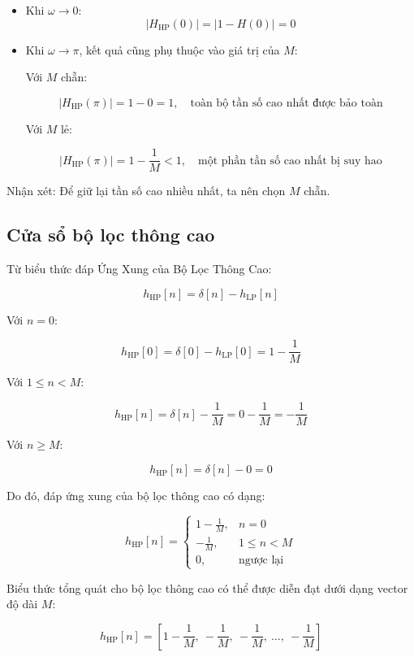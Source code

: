 \begin{itemize}
	\item Khi \( \omega \to 0 \):
	\[
	|H_{\mathrm{HP}}(0)| = |1 - H(0)| = 0
	\]
	
	\item Khi \( \omega \to \pi \), kết quả cũng phụ thuộc vào giá trị của \( M \):
	
	Với \( M \) chẵn:
	
	\[
	|H_{\mathrm{HP}}(\pi)| = 1 - 0 = 1, \quad \text{toàn bộ tần số cao nhất được bảo toàn}
	\]
	
	Với \( M \) lẻ:
	
	\[
	|H_{\mathrm{HP}}(\pi)| = 1 - \frac{1}{M} < 1, \quad \text{một phần tần số cao nhất bị suy hao}
	\]
\end{itemize}



Nhận xét: Để giữ lại tần số cao nhiều nhất, ta nên chọn \( M \) chẵn.

\subsection*{Cửa sổ bộ lọc thông cao}
\label{sec:cua_so_loc_thong_cao}

Từ biểu thức đáp Ứng Xung của Bộ Lọc Thông Cao:

\[
h_{\mathrm{HP}}[n] = \delta[n] - h_{\mathrm{LP}}[n]
\]

Với \( n = 0 \):

\[
h_{\mathrm{HP}}[0] = \delta[0] - h_{\mathrm{LP}}[0] = 1 - \frac{1}{M}
\]

Với \( 1 \leq n < M \):

\[
h_{\mathrm{HP}}[n] = \delta[n] - \frac{1}{M} = 0 - \frac{1}{M} = -\frac{1}{M}
\]

Với \( n \geq M \):

\[
h_{\mathrm{HP}}[n] = \delta[n] - 0 = 0
\]

Do đó, đáp ứng xung của bộ lọc thông cao có dạng:

\[
h_{\mathrm{HP}}[n] =
\begin{cases}
	1 - \frac{1}{M}, & n = 0 \\
	-\frac{1}{M}, & 1 \leq n < M \\
	0, & \text{ngược lại}
\end{cases}
\]

Biểu thức tổng quát cho bộ lọc thông cao có thể được diễn đạt dưới dạng vector độ dài \( M \):

\begin{equation}
	\label{eq:h_HP}
	h_{\mathrm{HP}}[n] = \left[ 1 - \frac{1}{M},\ -\frac{1}{M},\ -\frac{1}{M},\ \ldots,\ -\frac{1}{M} \right]
\end{equation}
%

